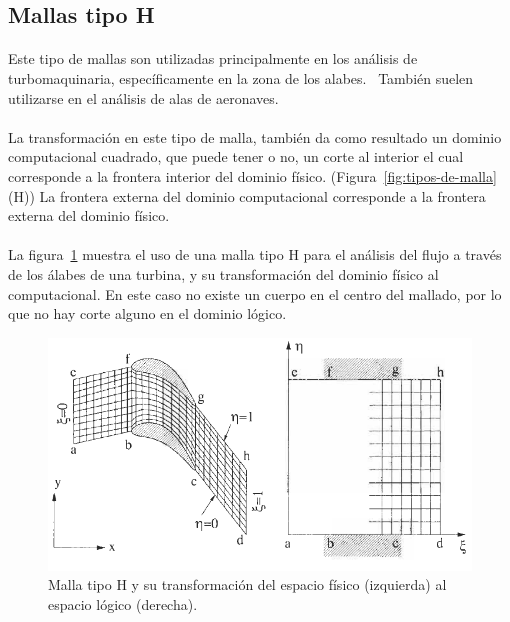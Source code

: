 \documentclass[letterpaper, openright, 12pt]{book}
\begin{document}
    \subsection{Mallas tipo H}
    \paragraph*{}
    Este tipo de mallas son utilizadas principalmente en los análisis de
    turbomaquinaria, específicamente en la zona de los
    alabes.~\cite{blazek}\cite{best-practices-grid-generation}
    También suelen utilizarse en el análisis de alas de
    aeronaves.~\cite{vladimir-grid}

    \paragraph*{}
    La transformación en este tipo de malla, también da como resultado un
    dominio computacional cuadrado, que puede tener o no, un corte al
    interior el cual corresponde a la frontera interior del dominio físico.
    (Figura~\ref{fig:tipos-de-malla} (H)) La frontera externa del dominio
    computacional corresponde a la frontera externa del dominio físico.

    \paragraph*{}
    La figura~\ref{fig:malla-h} muestra el uso de una malla tipo H para el
    análisis del flujo a través de los álabes de una turbina, y su
    transformación del dominio físico al computacional. En este caso no
    existe un cuerpo en el centro del mallado, por lo que no hay corte
    alguno en el dominio lógico.
        \begin{figure}[htbp!]
            \centering
            \includegraphics[keepaspectratio, width=170mm]{./Imagenes/malla-h}
            \captionsetup{justification=centering, margin=2cm}
            \caption[Malla tipo O]{Malla tipo H y su transformación del
                espacio físico (izquierda) al espacio lógico (derecha).
                \cite{blazek}}
        \label{fig:malla-h}
        \end{figure}
\end{document}
